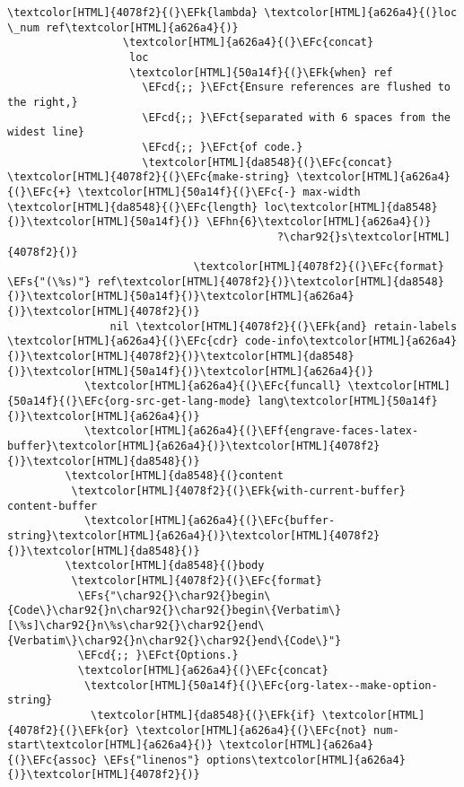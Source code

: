 \documentclass{scrartcl}
\newcommand{\EFk}[1]{\textcolor{EFk}{#1}} %
\newcommand{\EFs}[1]{\textcolor{EFs}{#1}} %
\newcommand{\EFct}[1]{\textcolor{EFct}{#1}} %
\newcommand{\EFc}[1]{\textcolor{EFc}{#1}} %
\newcommand{\EFf}[1]{\textcolor{EFf}{#1}} %
\newcommand{\EFcd}[1]{\textcolor{EFcd}{#1}} %
\newcommand{\EFhn}[1]{\textcolor{EFhn}{\textbf{#1}}} %
\begin{document}
\begin{enumerate}
\begin{Code}
\begin{Verbatim}[]
                \textcolor[HTML]{4078f2}{(}\EFk{lambda} \textcolor[HTML]{a626a4}{(}loc \_num ref\textcolor[HTML]{a626a4}{)}
                  \textcolor[HTML]{a626a4}{(}\EFc{concat}
                   loc
                   \textcolor[HTML]{50a14f}{(}\EFk{when} ref
                     \EFcd{;; }\EFct{Ensure references are flushed to the right,}
                     \EFcd{;; }\EFct{separated with 6 spaces from the widest line}
                     \EFcd{;; }\EFct{of code.}
                     \textcolor[HTML]{da8548}{(}\EFc{concat} \textcolor[HTML]{4078f2}{(}\EFc{make-string} \textcolor[HTML]{a626a4}{(}\EFc{+} \textcolor[HTML]{50a14f}{(}\EFc{-} max-width \textcolor[HTML]{da8548}{(}\EFc{length} loc\textcolor[HTML]{da8548}{)}\textcolor[HTML]{50a14f}{)} \EFhn{6}\textcolor[HTML]{a626a4}{)}
                                          ?\char92{}s\textcolor[HTML]{4078f2}{)}
                             \textcolor[HTML]{4078f2}{(}\EFc{format} \EFs{"(\%s)"} ref\textcolor[HTML]{4078f2}{)}\textcolor[HTML]{da8548}{)}\textcolor[HTML]{50a14f}{)}\textcolor[HTML]{a626a4}{)}\textcolor[HTML]{4078f2}{)}
                nil \textcolor[HTML]{4078f2}{(}\EFk{and} retain-labels \textcolor[HTML]{a626a4}{(}\EFc{cdr} code-info\textcolor[HTML]{a626a4}{)}\textcolor[HTML]{4078f2}{)}\textcolor[HTML]{da8548}{)}\textcolor[HTML]{50a14f}{)}\textcolor[HTML]{a626a4}{)}
            \textcolor[HTML]{a626a4}{(}\EFc{funcall} \textcolor[HTML]{50a14f}{(}\EFc{org-src-get-lang-mode} lang\textcolor[HTML]{50a14f}{)}\textcolor[HTML]{a626a4}{)}
            \textcolor[HTML]{a626a4}{(}\EFf{engrave-faces-latex-buffer}\textcolor[HTML]{a626a4}{)}\textcolor[HTML]{4078f2}{)}\textcolor[HTML]{da8548}{)}
         \textcolor[HTML]{da8548}{(}content
          \textcolor[HTML]{4078f2}{(}\EFk{with-current-buffer} content-buffer
            \textcolor[HTML]{a626a4}{(}\EFc{buffer-string}\textcolor[HTML]{a626a4}{)}\textcolor[HTML]{4078f2}{)}\textcolor[HTML]{da8548}{)}
         \textcolor[HTML]{da8548}{(}body
          \textcolor[HTML]{4078f2}{(}\EFc{format}
           \EFs{"\char92{}\char92{}begin\{Code\}\char92{}n\char92{}\char92{}begin\{Verbatim\}[\%s]\char92{}n\%s\char92{}\char92{}end\{Verbatim\}\char92{}n\char92{}\char92{}end\{Code\}"}
           \EFcd{;; }\EFct{Options.}
           \textcolor[HTML]{a626a4}{(}\EFc{concat}
            \textcolor[HTML]{50a14f}{(}\EFc{org-latex--make-option-string}
             \textcolor[HTML]{da8548}{(}\EFk{if} \textcolor[HTML]{4078f2}{(}\EFk{or} \textcolor[HTML]{a626a4}{(}\EFc{not} num-start\textcolor[HTML]{a626a4}{)} \textcolor[HTML]{a626a4}{(}\EFc{assoc} \EFs{"linenos"} options\textcolor[HTML]{a626a4}{)}\textcolor[HTML]{4078f2}{)}

\end{Verbatim}
\end{Code}
\end{enumerate}
\end{document}
